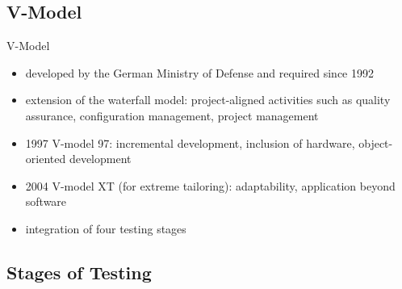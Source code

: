 
\subsection{V-Model}
\begin{frame}{\insertsubsection}
	\begin{fancycolumns}
		\begin{definition}{V-Model \mysource{\ludewiglichter}}
			\begin{itemize}
				\item developed by the German Ministry of Defense  and required since 1992
				\item extension of the waterfall model: project-aligned activities such as quality assurance, configuration management, project management
				\item 1997 V-model 97: incremental development, inclusion of hardware, object-oriented development
				\item 2004 V-model XT (for extreme tailoring): adaptability, application beyond software
				\item integration of four testing stages
			\end{itemize}
		\end{definition}
		\nextcolumn
		\diagramVModel
	\end{fancycolumns}
\end{frame}

\subsection{Stages of Testing}
\begin{frame}{\insertsubsection\ \ \mytitlesource{\ludewiglichter, \sommerville}}
	\slideStagesTesting
\end{frame}

